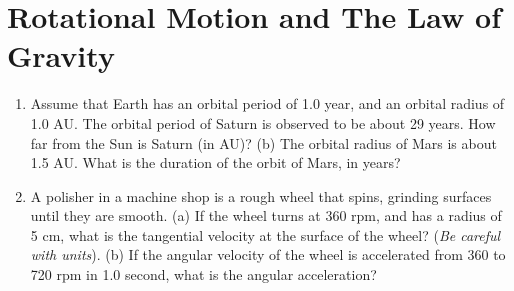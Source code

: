 \documentclass[10pt]{article}
\begin{document}
\section{Rotational Motion and The Law of Gravity}
\begin{enumerate}
\item Assume that Earth has an orbital period of 1.0 year, and an orbital radius of 1.0 AU.  The orbital period of Saturn is observed to be about 29 years.  How far from the Sun is Saturn (in AU)? (b) The orbital radius of Mars is about 1.5 AU.  What is the duration of the orbit of Mars, in years? \\ \vspace{1.5 cm}
\item A polisher in a machine shop is a rough wheel that spins, grinding surfaces until they are smooth.  (a) If the wheel turns at 360 rpm, and has a radius of 5 cm, what is the tangential velocity at the surface of the wheel? (\textit{Be careful with units}). (b) If the angular velocity of the wheel is accelerated from 360 to 720 rpm in 1.0 second, what is the angular acceleration? \\ \vspace{1.0cm}
\end{enumerate}
\end{document}

